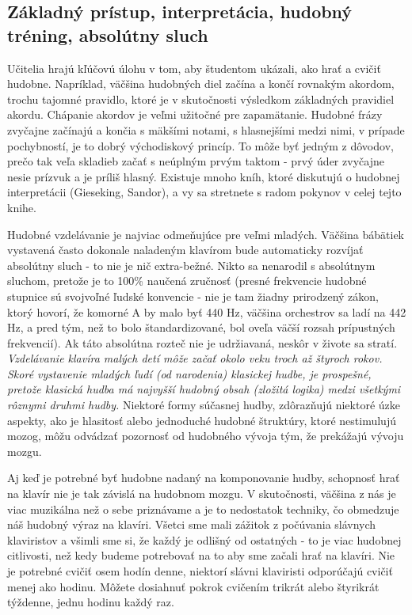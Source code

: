 \subsection{Základný prístup, interpretácia, hudobný tréning, absolútny sluch}
Učitelia hrajú kľúčovú úlohu v tom, aby študentom ukázali, ako hrať a cvičiť hudobne. Napríklad, väčšina hudobných diel začína a končí rovnakým akordom, trochu tajomné pravidlo, ktoré je v skutočnosti výsledkom základných pravidiel akordu. Chápanie akordov je veľmi užitočné pre zapamätanie. Hudobné frázy zvyčajne začínajú a končia s mäkšími notami, s hlasnejšími medzi nimi, v prípade pochybností, je to dobrý východiskový princíp. To môže byť jedným z dôvodov, prečo tak veľa skladieb začať s neúplným prvým taktom - prvý úder zvyčajne nesie prízvuk a je príliš hlasný. Existuje mnoho kníh, ktoré diskutujú o hudobnej interpretácii (Gieseking, Sandor), a vy sa stretnete  s radom pokynov v celej tejto knihe. 

Hudobné vzdelávanie je najviac odmeňujúce pre veľmi mladých. Väčšina bábätiek vystavená často dokonale naladeným klavírom bude automaticky rozvíjať absolútny sluch - to nie je nič extra-bežné. Nikto sa nenarodil s absolútnym sluchom, pretože je to 100\% naučená zručnosť (presné frekvencie hudobné stupnice sú svojvoľné ľudské konvencie - nie je tam žiadny prirodzený zákon, ktorý hovorí, že  komorné A by malo byť 440 Hz, väčšina orchestrov sa ladí na 442 Hz, a pred tým, než to bolo štandardizované, bol oveľa väčší rozsah prípustných frekvencií). Ak táto absolútna rozteč nie je udržiavaná, neskôr v živote sa stratí. \emph{Vzdelávanie klavíra malých detí môže začať okolo veku troch až štyroch rokov. Skoré vystavenie mladých ľudí (od narodenia) klasickej hudbe, je prospešné, pretože klasická hudba má najvyšší hudobný obsah (zložitá logika) medzi všetkými rôznymi druhmi hudby.} Niektoré formy súčasnej hudby, zdôrazňujú niektoré úzke aspekty, ako je hlasitosť alebo jednoduché hudobné štruktúry, ktoré nestimulujú mozog, môžu odvádzať pozornosť od hudobného vývoja tým, že prekážajú vývoju mozgu.

Aj keď je potrebné byť hudobne nadaný na komponovanie hudby, schopnosť hrať na klavír nie je tak závislá na hudobnom mozgu. V skutočnosti, väčšina z nás je viac muzikálna než o sebe priznávame a je to nedostatok techniky, čo obmedzuje náš hudobný výraz na klavíri. Všetci sme mali zážitok z počúvania slávnych klaviristov a všimli sme si, že každý je odlišný od ostatných - to je viac hudobnej citlivosti, než kedy budeme potrebovať na to aby sme začali hrať na klavíri. Nie je potrebné cvičiť osem hodín denne, niektorí slávni klaviristi odporúčajú cvičiť menej ako hodinu. Môžete dosiahnuť pokrok cvičením trikrát alebo štyrikrát týždenne, jednu hodinu každý raz.

